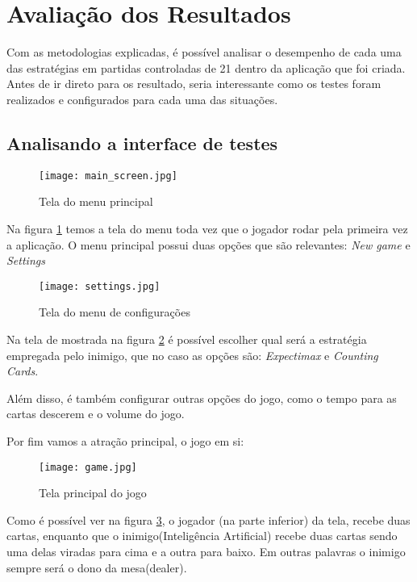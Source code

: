 \section{Avaliação dos Resultados}

Com as metodologias explicadas, é possível analisar o desempenho de cada uma das 
estratégias em partidas controladas de 21 dentro da aplicação que foi criada. Antes 
de ir direto para os resultado, seria interessante como os testes foram realizados 
e configurados para cada uma das situações.

\subsection{Analisando a interface de testes}

\begin{figure}[ht] 
    \centering
    \texttt{[image: main\_screen.jpg]}
    \caption{Tela do menu principal}
    \label{fig:main_menu}
\end{figure}

\newpage

Na figura \ref{fig:main_menu} temos a tela do menu toda vez que o jogador rodar pela 
primeira vez a aplicação. O menu principal possui duas opções que são relevantes: \emph{New game} e \emph{Settings}

\begin{figure}[ht] 
    \centering
    \texttt{[image: settings.jpg]}
    \caption{Tela do menu de configurações}
    \label{fig:settings}
\end{figure}

Na tela de mostrada na figura \ref{fig:settings} é possível escolher qual será a estratégia 
empregada pelo inimigo, que no caso as opções são: \emph{Expectimax} e \emph{Counting Cards}.

Além disso, é também configurar outras opções do jogo, como o tempo para 
as cartas descerem e o volume do jogo.

Por fim vamos a atração principal, o jogo em si:

\begin{figure}[ht] 
    \centering
    \texttt{[image: game.jpg]}
    \caption{Tela principal do jogo}
    \label{fig:game}
\end{figure}

Como é possível ver na figura \ref{fig:game}, o jogador (na parte inferior)
da tela, recebe duas cartas, enquanto que o inimigo(Inteligência Artificial)
recebe duas cartas sendo uma delas viradas para cima e a outra para baixo. Em 
outras palavras o inimigo sempre será o dono da mesa(dealer).

